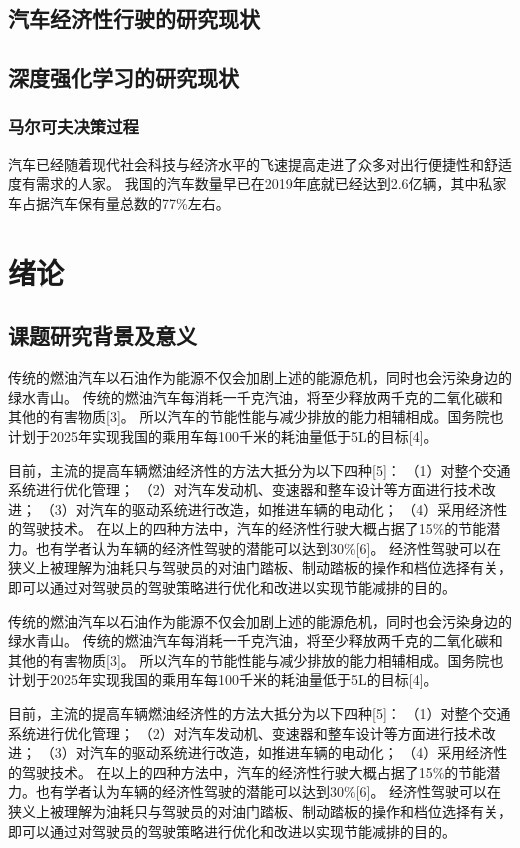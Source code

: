 \section{汽车经济性行驶的研究现状}
\section{深度强化学习的研究现状}
\subsection{马尔可夫决策过程}
汽车已经随着现代社会科技与经济水平的飞速提高走进了众多对出行便捷性和舒适度有需求的人家。
我国的汽车数量早已在2019年底就已经达到2.6亿辆，其中私家车占据汽车保有量总数的77\%左右。
\chapter{绪论}
\section{课题研究背景及意义}
\par  传统的燃油汽车以石油作为能源不仅会加剧上述的能源危机，同时也会污染身边的绿水青山。
传统的燃油汽车每消耗一千克汽油，将至少释放两千克的二氧化碳和其他的有害物质[3]。
所以汽车的节能性能与减少排放的能力相辅相成。国务院也计划于2025年实现我国的乘用车每100千米的耗油量低于5L的目标[4]。

\par  目前，主流的提高车辆燃油经济性的方法大抵分为以下四种[5]：
    （1）对整个交通系统进行优化管理；
    （2）对汽车发动机、变速器和整车设计等方面进行技术改进；
    （3）对汽车的驱动系统进行改造，如推进车辆的电动化；
    （4）采用经济性的驾驶技术。
在以上的四种方法中，汽车的经济性行驶大概占据了15\%的节能潜力。也有学者认为车辆的经济性驾驶的潜能可以达到30\%[6]。
经济性驾驶可以在狭义上被理解为油耗只与驾驶员的对油门踏板、制动踏板的操作和档位选择有关，
即可以通过对驾驶员的驾驶策略进行优化和改进以实现节能减排的目的。

\par  传统的燃油汽车以石油作为能源不仅会加剧上述的能源危机，同时也会污染身边的绿水青山。
传统的燃油汽车每消耗一千克汽油，将至少释放两千克的二氧化碳和其他的有害物质[3]。
所以汽车的节能性能与减少排放的能力相辅相成。国务院也计划于2025年实现我国的乘用车每100千米的耗油量低于5L的目标[4]。

\par  目前，主流的提高车辆燃油经济性的方法大抵分为以下四种[5]：
    （1）对整个交通系统进行优化管理；
    （2）对汽车发动机、变速器和整车设计等方面进行技术改进；
    （3）对汽车的驱动系统进行改造，如推进车辆的电动化；
    （4）采用经济性的驾驶技术。
在以上的四种方法中，汽车的经济性行驶大概占据了15\%的节能潜力。也有学者认为车辆的经济性驾驶的潜能可以达到30\%[6]。
经济性驾驶可以在狭义上被理解为油耗只与驾驶员的对油门踏板、制动踏板的操作和档位选择有关，
即可以通过对驾驶员的驾驶策略进行优化和改进以实现节能减排的目的。

